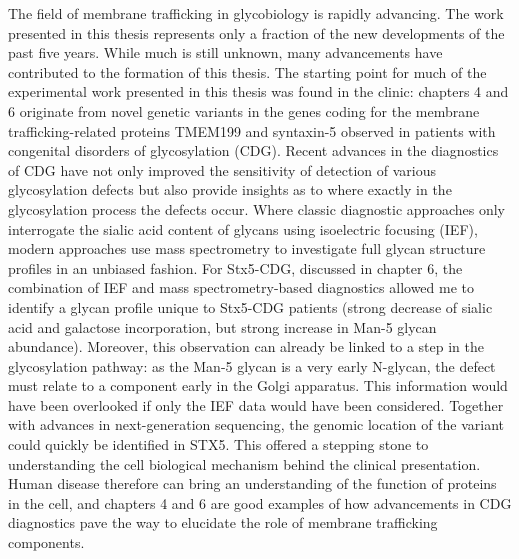 The field of membrane trafficking in glycobiology is rapidly advancing. The work presented in this thesis represents only a fraction of the new developments of the past five years. While much is still unknown, many advancements have contributed to the formation of this thesis. The starting point for much of the experimental work presented in this thesis was found in the clinic: chapters 4 and 6 originate from novel genetic variants in the genes coding for the membrane trafficking-related proteins TMEM199 and syntaxin-5 observed in patients with congenital disorders of glycosylation (CDG). Recent advances in the diagnostics of CDG have not only improved the sensitivity of detection of various glycosylation defects but also provide insights as to where exactly in the glycosylation process the defects occur. Where classic diagnostic approaches only interrogate the sialic acid content of glycans using isoelectric focusing (IEF)\cite{marklova_screening_2007}, modern approaches use mass spectrometry to investigate full glycan structure profiles in an unbiased fashion\cite{abu_bakar_clinical_2018,van_scherpenzeel_high-resolution_2015,hipgrave_ederveen_dissecting_2020}. For Stx5-CDG, discussed in chapter 6, the combination of IEF and mass spectrometry-based diagnostics allowed me to identify a glycan profile unique to Stx5-CDG patients (strong decrease of sialic acid and galactose incorporation, but strong increase in Man-5 glycan abundance). Moreover, this observation can already be linked to a step in the glycosylation pathway: as the Man-5 glycan is a very early N-glycan, the defect must relate to a component early in the Golgi apparatus. This information would have been overlooked if only the IEF data would have been considered. Together with advances in next-generation sequencing\cite{de_ligt_diagnostic_2012,gilissen_genome_2014}, the genomic location of the variant could quickly be identified in STX5. This offered a stepping stone to understanding the cell biological mechanism behind the clinical presentation. Human disease therefore can bring an understanding of the function of proteins in the cell, and chapters 4 and 6 are good examples of how advancements in CDG diagnostics pave the way to elucidate the role of membrane trafficking components.

